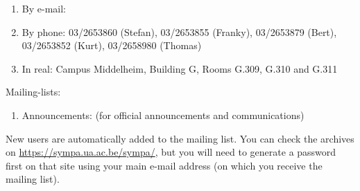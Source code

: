 \begin{enumerate}
\item  By e-mail:  \hpcinfo
\item  By phone: 03/2653860 (Stefan), 03/2653855 (Franky), 03/2653879 (Bert), 03/2653852 (Kurt), 03/2658980 (Thomas)
\item  In real: Campus Middelheim, Building G, Rooms G.309, G.310 and G.311
\end{enumerate}

Mailing-lists:

\begin{enumerate}
\item  Announcements: \hpcannounceml (for official announcements and communications)
\end{enumerate}

New users are automatically added to the mailing list.
You can check the archives on \url{https://sympa.ua.ac.be/sympa/}, but you will need to
generate a password first on that site using your main e-mail address (on which you
receive the mailing list).
